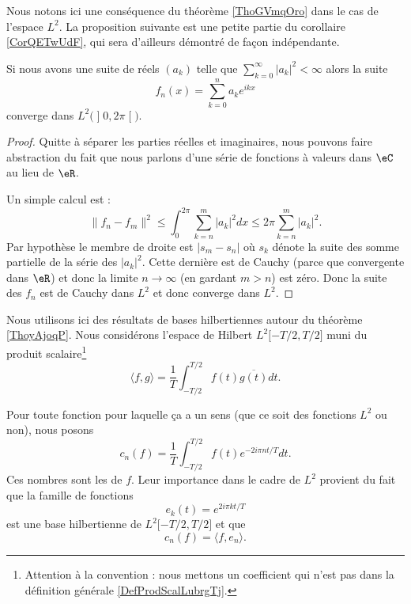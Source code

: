 Nous notons ici une conséquence du théorème \ref{ThoGVmqOro} dans le cas de l'espace \( L^2\). La proposition suivante est une petite partie du corollaire \ref{CorQETwUdF}, qui sera d'ailleurs démontré de façon indépendante.

\begin{proposition}
    Si nous avons une suite de réels \( (a_k)\) telle que \( \sum_{k=0}^{\infty}| a_k |^2<\infty\) alors la suite
    \begin{equation}
        f_n(x)=\sum_{k=0}^na_k e^{ikx}
    \end{equation}
    converge dans \( L^2\big( \mathopen] 0 , 2\pi \mathclose[ \big)\).
\end{proposition}

\begin{proof}
    Quitte à séparer les parties réelles et imaginaires, nous pouvons faire abstraction du fait que nous parlons d'une série de fonctions à valeurs dans \( \eC\) au lieu de \( \eR\).

    Un simple calcul est :
    \begin{equation}    \label{EqHVdJxZT}
        \| f_n-f_m \|^2\leq\int_0^{2\pi}\sum_{k=n}^m| a_k |^2dx\leq 2\pi\sum_{k=n}^m| a_k |^2.
    \end{equation}
    Par hypothèse le membre de droite est \( | s_m-s_n |\) où \( s_k\) dénote la suite des somme partielle de la série des \( | a_k |^2\). Cette dernière est de Cauchy (parce que convergente dans \( \eR\)) et donc la limite \( n\to\infty\) (en gardant \( m>n\)) est zéro. Donc la suite des \( f_n\) est de Cauchy dans \( L^2\) et donc converge dans \( L^2\).
\end{proof}


Nous utilisons ici des résultats de bases hilbertiennes autour du théorème \ref{ThoyAjoqP}. Nous considérons l'espace de Hilbert \( L^2\mathopen[ -T/2 , T/2 \mathclose]\) muni du produit scalaire\footnote{Attention à la convention : nous mettons un coefficient qui n'est pas dans la définition générale \eqref{DefProdScalLubrgTj}.}
\begin{equation}    \label{EqQBcpyyJ}
    \langle f, g\rangle =\frac{1}{ T }\int_{-T/2}^{T/2}f(t)\overline{ g(t) }dt.
\end{equation}


Pour toute fonction pour laquelle ça a un sens (que ce soit des fonctions \( L^2\) ou non), nous posons
\begin{equation}\label{EqhIPoPH}
    c_n(f)=\frac{1}{ T }\int_{-T/2}^{T/2}f(t) e^{-2i\pi nt/T}dt.
\end{equation}
Ces nombres sont les  de \( f\). Leur importance dans le cadre de \( L^2\) provient du fait que la famille de fonctions
\begin{equation}
    e_k(t)=  e^{2i\pi kt/T}
\end{equation}
est une base hilbertienne de \( L^2\mathopen[ -T/2 , T/2 \mathclose]\) et que
\begin{equation}
    c_n(f)=\langle f, e_n\rangle .
\end{equation}

